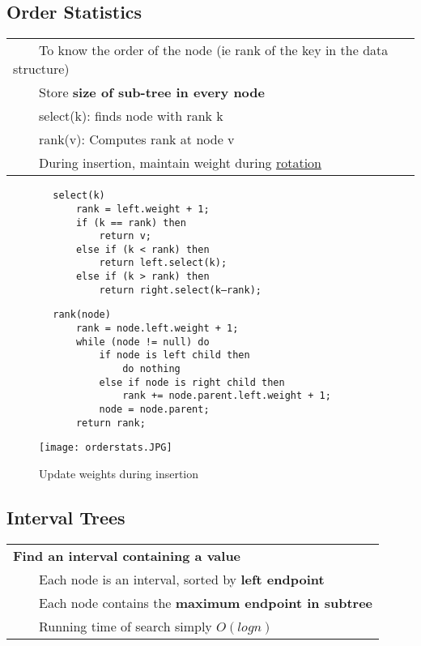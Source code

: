 \documentclass{article}
\newcommand{\tabitem}{~~\llap{\textbullet}~~}
\begin{document}
    \subsection{Order Statistics}

    \begin{tabular}{l}
        \tabitem To know the order of the node (ie rank of the key in the data structure)\\
        \tabitem Store \textbf{size of sub-tree in every node}\\
        \tabitem select(k): finds node with rank k\\
        \tabitem rank(v): Computes rank at node v\\
        \tabitem During insertion, maintain weight during \hyperref[orderstats]{rotation}
    \end{tabular}

    \begin{verbatim}
        select(k)
            rank = left.weight + 1;
            if (k == rank) then
                return v;
            else if (k < rank) then
                return left.select(k);
            else if (k > rank) then
                return right.select(k–rank);
    \end{verbatim}

    \begin{verbatim}
        rank(node)
            rank = node.left.weight + 1;
            while (node != null) do
                if node is left child then
                    do nothing
                else if node is right child then
                    rank += node.parent.left.weight + 1;
                node = node.parent;
            return rank;
    \end{verbatim}

    \begin{figure}[htbp]
        \begin{center}
        \texttt{[image: orderstats.JPG]}
        \caption{Update weights during insertion}
        \label{orderstats}
        \end{center}
    \end{figure}

    \pagebreak

    \subsection{Interval Trees}

    \begin{tabular}{l}
        \textbf{Find an interval containing a value}\\
        \tabitem Each node is an interval, sorted by \textbf{left endpoint}\\
        \tabitem Each node contains the \textbf{maximum endpoint in subtree}\\
        \tabitem Running time of search simply $O(logn)$\\
    \end{tabular}
\end{document}
